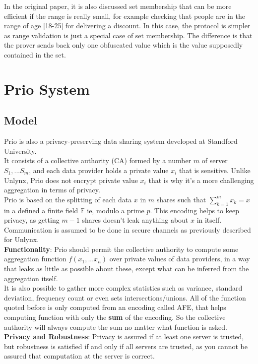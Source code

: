 \documentclass{article}
\begin{document}
In the original paper, it is also discussed set membership that can be more efficient if the range is really small, for example checking that people are in the range of age [18-25] for delivering a discount.
In this case, the protocol is simpler as range validation is just a special case of set membership. The difference is that the prover sends back only one obfuscated value which is the value supposedly contained in the set.

\section{Prio System}
\subsection{Model}
Prio \cite{prio}  is also a privacy-preserving data sharing system developed at Standford University.\\
It consists of a collective authority (CA) formed by a number $m$ of server $S_1,...S_m$, and each data provider holds a private value $x_i$ that is sensitive. 
Unlike Unlynx, Prio does not encrypt private value $x_i$ that is why it's a more challenging aggregation in terms of privacy.\\
Prio is based on the splitting of each data $x$ in $m$ shares such that $\sum^m_{k=1}{x_k} = x $ in a defined a finite field $\mathbb{F}$ ie, modulo a prime $p$. This encoding helps to keep privacy, as getting $m-1$ shares doesn't leak anything about $x$ in itself.\\
Communication is assumed to be done in secure channels as previously described for Unlynx.\\
\textbf{Functionality}: Prio should permit the collective authority to compute some aggregation function $f(x_1,...x_n)$ over private values of data providers, in a way that leaks as little as possible about these, except what can be inferred from the aggregation itself.\\
It is also possible to gather more complex statistics such as variance, standard deviation, frequency count or even sets intersections/unions. All of the function quoted before is only computed from an encoding called AFE, that helps computing function with only the \textbf{sum} of the encoding. So the collective authority will always compute the sum no matter what function is asked.\\
\textbf{Privacy and Robustness}: Privacy is assured if at least one server is trusted, but robustness is satisfied if and only if all servers are trusted, as you cannot be assured that computation at the server is correct.
\end{document}
